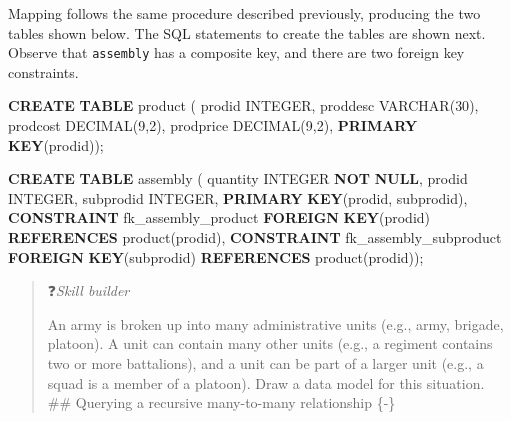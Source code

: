 \documentclass[
]{article}
\newenvironment{Shaded}{\begin{snugshade}}{\end{snugshade}}
\newcommand{\DataTypeTok}[1]{\textcolor[rgb]{0.13,0.29,0.53}{#1}}
\newcommand{\DecValTok}[1]{\textcolor[rgb]{0.00,0.00,0.81}{#1}}
\newcommand{\KeywordTok}[1]{\textcolor[rgb]{0.13,0.29,0.53}{\textbf{#1}}}
\newcommand{\NormalTok}[1]{#1}
\begin{document}
Mapping follows the same procedure described previously, producing the
two tables shown below. The SQL statements to create the tables are
shown next. Observe that \texttt{assembly} has a composite key, and there are
two foreign key constraints.

\begin{Shaded}
\begin{Highlighting}[]
\KeywordTok{CREATE} \KeywordTok{TABLE}\NormalTok{ product (}
\NormalTok{    prodid          }\DataTypeTok{INTEGER}\NormalTok{,}
\NormalTok{    proddesc        }\DataTypeTok{VARCHAR}\NormalTok{(}\DecValTok{30}\NormalTok{),}
\NormalTok{    prodcost        }\DataTypeTok{DECIMAL}\NormalTok{(}\DecValTok{9}\NormalTok{,}\DecValTok{2}\NormalTok{),}
\NormalTok{    prodprice       }\DataTypeTok{DECIMAL}\NormalTok{(}\DecValTok{9}\NormalTok{,}\DecValTok{2}\NormalTok{),}
        \KeywordTok{PRIMARY} \KeywordTok{KEY}\NormalTok{(prodid));}
\end{Highlighting}
\end{Shaded}

\begin{Shaded}
\begin{Highlighting}[]
\KeywordTok{CREATE} \KeywordTok{TABLE}\NormalTok{ assembly (}
\NormalTok{    quantity        }\DataTypeTok{INTEGER} \KeywordTok{NOT} \KeywordTok{NULL}\NormalTok{,}
\NormalTok{    prodid          }\DataTypeTok{INTEGER}\NormalTok{,}
\NormalTok{    subprodid       }\DataTypeTok{INTEGER}\NormalTok{,}
        \KeywordTok{PRIMARY} \KeywordTok{KEY}\NormalTok{(prodid, subprodid),}
        \KeywordTok{CONSTRAINT}\NormalTok{ fk\_assembly\_product }\KeywordTok{FOREIGN} \KeywordTok{KEY}\NormalTok{(prodid)}
            \KeywordTok{REFERENCES}\NormalTok{ product(prodid),}
        \KeywordTok{CONSTRAINT}\NormalTok{ fk\_assembly\_subproduct }\KeywordTok{FOREIGN} \KeywordTok{KEY}\NormalTok{(subprodid)}
            \KeywordTok{REFERENCES}\NormalTok{ product(prodid));}
\end{Highlighting}
\end{Shaded}

\begin{quote}
❓\emph{Skill builder}

An army is broken up into many administrative units (e.g., army,
brigade, platoon). A unit can contain many other units (e.g., a
regiment contains two or more battalions), and a unit can be part of a
larger unit (e.g., a squad is a member of a platoon). Draw a data
model for this situation.\\
\#\# Querying a recursive many-to-many relationship \{-\}
\end{quote}
\end{document}

